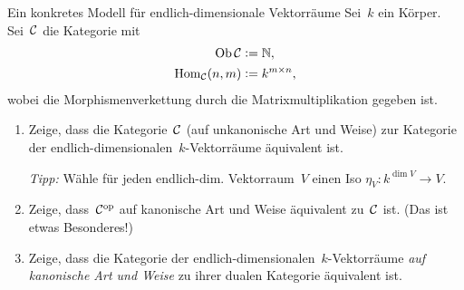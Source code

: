 \documentclass{uebblatt}
\begin{document}

\begin{aufgabe}{Ein konkretes Modell für endlich-dimensionale Vektorräume}
Sei~$k$ ein Körper. Sei~$\mathcal{C}$ die Kategorie mit
\begin{align*}
  \operatorname{Ob} \mathcal{C} &\vcentcolon= \mathbb{N}, \\
  \mathrm{Hom}_{\mathcal{C}}(n, m) &\vcentcolon= k^{m \times n},
\end{align*}
wobei die Morphismenverkettung durch die Matrixmultiplikation gegeben ist.
\begin{enumerate}
\item Zeige, dass die Kategorie~$\mathcal{C}$ (auf unkanonische Art und Weise) zur Kategorie der
endlich-dimensionalen~$k$-Vektorräume äquivalent ist.

\emph{Tipp:} Wähle für jeden endlich-dim. Vektorraum~$V$ einen Iso
$\eta_V : k^{\dim V} \to V$.
\item Zeige, dass~$\mathcal{C}^{\mathrm{op}}$ auf kanonische Art und Weise äquivalent zu~$\mathcal{C}$ ist. (Das ist etwas
Besonderes!)
\item Zeige, dass die Kategorie der endlich-dimensionalen~$k$-Vektorräume
\emph{auf kanonische Art und Weise} zu ihrer dualen Kategorie äquivalent ist.
\end{enumerate}
\end{aufgabe}
\end{document}
